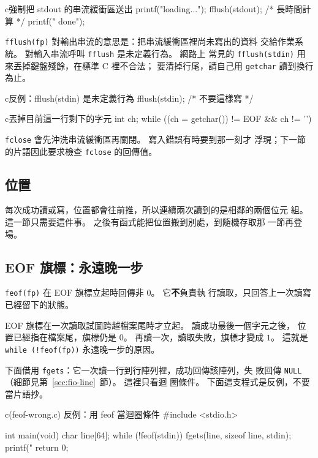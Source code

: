 \begin{code}{c}{強制把 stdout 的串流緩衝區送出}
printf("loading...");
fflush(stdout);
/* 長時間計算 */
printf(" done\n");
\end{code}

\texttt{fflush(fp)} 對輸出串流的意思是：把串流緩衝區裡尚未寫出的資料
交給作業系統。 對輸入串流呼叫 \texttt{fflush} 是未定義行為。 網路上
常見的 \texttt{fflush(stdin)} 用來丟掉鍵盤殘餘，在標準 C 裡不合法；
要清掉行尾，請自己用 \texttt{getchar} 讀到換行為止。

\begin{code}{c}{反例：fflush(stdin) 是未定義行為}
fflush(stdin);    /* 不要這樣寫 */
\end{code}

\begin{code}{c}{丟掉目前這一行剩下的字元}
int ch;
while ((ch = getchar()) != EOF && ch != '\n') {
}
\end{code}

\texttt{fclose} 會先沖洗串流緩衝區再關閉。 寫入錯誤有時要到那一刻才
浮現；下一節的片語因此要求檢查 \texttt{fclose} 的回傳值。

\subsection{位置}

每次成功讀或寫，位置都會往前推，所以連續兩次讀到的是相鄰的兩個位元
組。 這一節只需要這件事。 之後有函式能把位置搬到別處，到隨機存取那
一節再登場。

\subsection{EOF 旗標：永遠晚一步}

\texttt{feof(fp)} 在 EOF 旗標立起時回傳非 $0$。 它\textbf{不}負責執
行讀取，只回答上一次讀寫已經留下的狀態。

EOF 旗標在一次讀取試圖跨越檔案尾時才立起。 讀成功最後一個字元之後，
位置已經指在檔案尾，旗標仍是 $0$。 再讀一次，讀取失敗，旗標才變成
$1$。 這就是 \texttt{while (!feof(fp))} 永遠晚一步的原因。

下面借用 \texttt{fgets}：它一次讀一行到行陣列裡，成功回傳該陣列，失
敗回傳 \texttt{NULL}（細節見第~\ref{sec:fio-line}~節）。 這裡只看迴
圈條件。 下面這支程式是反例，不要當片語抄。

\begin{example}[label=ex:fio-feof-wrong]{c}{(feof-wrong.c) 反例：用 feof 當迴圈條件}
#include <stdio.h>

int main(void) {
    char line[64];
    while (!feof(stdin)) {
        fgets(line, sizeof line, stdin);
        printf("%
    }
    return 0;
}
\end{example}

